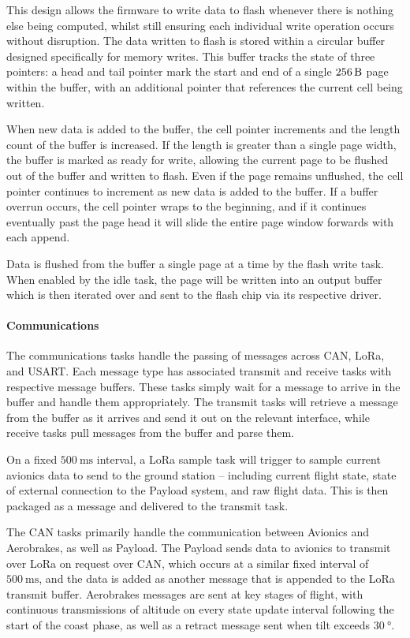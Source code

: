 This design allows the firmware to write data to flash whenever there is nothing else being computed, whilst still ensuring each individual write operation occurs without disruption. The data written to flash is stored within a circular buffer designed specifically for memory writes. This buffer tracks the state of three pointers: a head and tail pointer mark the start and end of a single $\qty{256}{\byte}$ page within the buffer, with an additional pointer that references the current cell being written.


When new data is added to the buffer, the cell pointer increments and the length count of the buffer is increased. If the length is greater than a single page width, the buffer is marked as ready for write, allowing the current page to be flushed out of the buffer and written to flash. Even if the page remains unflushed, the cell pointer continues to increment as new data is added to the buffer. If a buffer overrun occurs, the cell pointer wraps to the beginning, and if it continues eventually past the page head it will slide the entire page window forwards with each append.

Data is flushed from the buffer a single page at a time by the flash write task. When enabled by the idle task, the page will be written into an output buffer which is then iterated over and sent to the flash chip via its respective driver.

\paragraph{Communications}
The communications tasks handle the passing of messages across CAN, LoRa, and USART. Each message type has associated transmit and receive tasks with respective message buffers. These tasks simply wait for a message to arrive in the buffer and handle them appropriately. The transmit tasks will retrieve a message from the buffer as it arrives and send it out on the relevant interface, while receive tasks pull messages from the buffer and parse them.

On a fixed $\qty{500}{\milli\second}$ interval, a LoRa sample task will trigger to sample current avionics data to send to the ground station -- including current flight state, state of external connection to the Payload system, and raw flight data. This is then packaged as a message and delivered to the transmit task.

The CAN tasks primarily handle the communication between Avionics and Aerobrakes, as well as Payload. The Payload sends data to avionics to transmit over LoRa on request over CAN, which occurs at a similar fixed interval of $\qty{500}{\milli\second}$, and the data is added as another message that is appended to the LoRa transmit buffer. Aerobrakes messages are sent at key stages of flight, with continuous transmissions of altitude on every state update interval following the start of the coast phase, as well as a retract message sent when tilt exceeds $\qty{30}{\degree}$.

